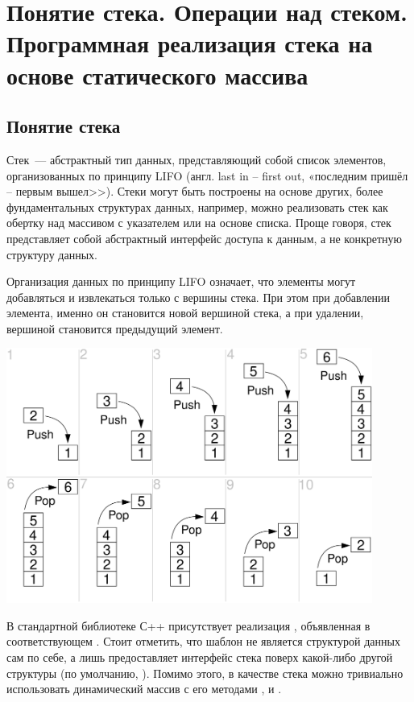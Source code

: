 \section{Понятие стека. Операции над стеком. Программная реализация стека на основе статического массива}
\subsection{Понятие стека}
Стек~--- абстрактный тип данных, представляющий собой список элементов, организованных по принципу
LIFO (англ. last in -- first out, «последним пришёл -- первым вышел>>). Стеки могут быть построены на основе других, более фундаментальных
структурах данных, например, можно реализовать стек как обертку над массивом с указателем или на основе списка. Проще говоря, стек представляет
собой абстрактный интерфейс доступа к данным, а не конкретную структуру данных.

Организация данных по принципу LIFO означает, что элементы могут добавляться и извлекаться только с вершины стека. При этом при добавлении
элемента, именно он становится новой вершиной стека, а при удалении, вершиной становится предыдущий элемент.

\includegraphics[width=0.9\textwidth]{resources/19-26/stack.png}

В стандартной библиотеке С++ присутствует реализация , объявленная в соответствующем
. Стоит отметить, что шаблон  не является
структурой данных сам по себе, а лишь предоставляет интерфейс стека поверх какой-либо другой структуры (по умолчанию, ).
Помимо этого, в качестве стека можно тривиально использовать динамический массив  с его
методами ,  и .
